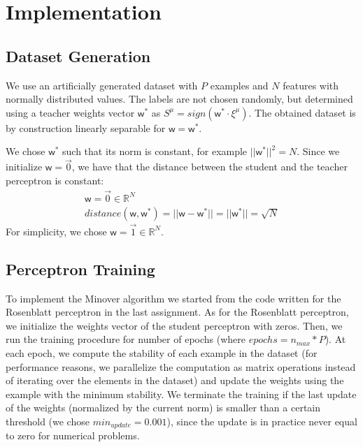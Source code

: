 \section{Implementation}
\label{sec:implementation}

\subsection{Dataset Generation}
We use an artificially generated dataset with $P$ examples and $N$ features with normally distributed values.
The labels are not chosen randomly, but determined using a teacher weights vector $\bm{\mathsf{w}}^*$ as $S^\mu = sign(\mathsf{w}^{*} \cdotp \xi^\mu)$.
The obtained dataset is by construction linearly separable for $\bm{\mathsf{w}} = \bm{\mathsf{w}}^*$.

We chose $\bm{\mathsf{w}}^*$ such that its norm is constant, for example $||\bm{\mathsf{w}}^*||^2 = N$.
Since we initialize $\bm{\mathsf{w}} = \overrightarrow{0}$, we have that the distance between the student and the teacher perceptron is constant:
\begin{gather*}
    \bm{\mathsf{w}} = \overrightarrow{0} \in \mathbb{R}^N \\
    distance(\bm{\mathsf{w}}, \bm{\mathsf{w}}^*) = || \bm{\mathsf{w}} - \bm{\mathsf{w}}^* || = || \bm{\mathsf{w}}^*|| = \sqrt{N}
\end{gather*}
For simplicity, we chose $\bm{\mathsf{w}} = \overrightarrow{1} \in \mathbb{R}^N$.

\subsection{Perceptron Training}
To implement the Minover algorithm we started from the code written for the Rosenblatt perceptron in the last assignment.
As for the Rosenblatt perceptron, we initialize the weights vector of the student perceptron with zeros.
Then, we run the training procedure for number of epochs (where $epochs = n_{max} * P$).
At each epoch, we compute the stability of each example in the dataset (for performance reasons, we parallelize the computation as matrix operations instead of iterating over the elements in the dataset) and update the weights using the example with the minimum stability.
We terminate the training if the last update of the weights (normalized by the current norm) is smaller than a certain threshold (we chose $min_{update} = 0.001$), since the update is in practice never equal to zero for numerical problems.


